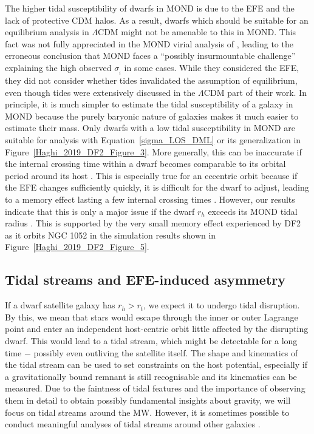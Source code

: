 \documentclass[fleqn,usenatbib,useAMS]{mnras} %
\begin{document}
The higher tidal susceptibility of dwarfs in MOND is due to the EFE and the lack of protective CDM halos. As a result, dwarfs which should be suitable for an equilibrium analysis in $\Lambda$CDM might not be amenable to this in MOND. This fact was not fully appreciated in the MOND virial analysis of \citet{Fattahi_2018}, leading to the erroneous conclusion that MOND faces a ``possibly insurmountable challenge'' explaining the high observed $\sigma_{_i}$ in some cases. While they considered the EFE, they did not consider whether tides invalidated the assumption of equilibrium, even though tides were extensively discussed in the $\Lambda$CDM part of their work. In principle, it is much simpler to estimate the tidal susceptibility of a galaxy in MOND because the purely baryonic nature of galaxies makes it much easier to estimate their mass. Only dwarfs with a low tidal susceptibility in MOND are suitable for analysis with Equation~\ref{sigma_LOS_DML} or its generalization in Figure~\ref{Haghi_2019_DF2_Figure_3}. More generally, this can be inaccurate if the internal crossing time within a dwarf becomes comparable to its orbital period around its host \citep{Brada_2000_tides, McGaugh_Wolf_2010}. This is especially true for an eccentric orbit because if the EFE changes sufficiently quickly, it is difficult for the dwarf to adjust, leading to a memory effect lasting a few internal crossing times \citep{Wu_2013}. However, our results indicate that this is only a major issue if the dwarf $r_h$ exceeds its MOND tidal radius \citep{Zhao_2005, Zhao_2006}. This is supported by the very small memory effect experienced by DF2 as it orbits NGC 1052 in the simulation results shown in Figure~\ref{Haghi_2019_DF2_Figure_5}.



\subsection{Tidal streams and EFE-induced asymmetry}
\label{Tidal_streams}

If a dwarf satellite galaxy has $r_h > r_t$, we expect it to undergo tidal disruption. By this, we mean that stars would escape through the inner or outer Lagrange point and enter an independent host-centric orbit little affected by the disrupting dwarf. This would lead to a tidal stream, which might be detectable for a long time $-$ possibly even outliving the satellite itself. The shape and kinematics of the tidal stream can be used to set constraints on the host potential, especially if a gravitationally bound remnant is still recognisable and its kinematics can be measured. Due to the faintness of tidal features and the importance of observing them in detail to obtain possibly fundamental insights about gravity, we will focus on tidal streams around the MW. However, it is sometimes possible to conduct meaningful analyses of tidal streams around other galaxies \citep[e.g. around M31;][]{Fardal_2013}.
\end{document}
